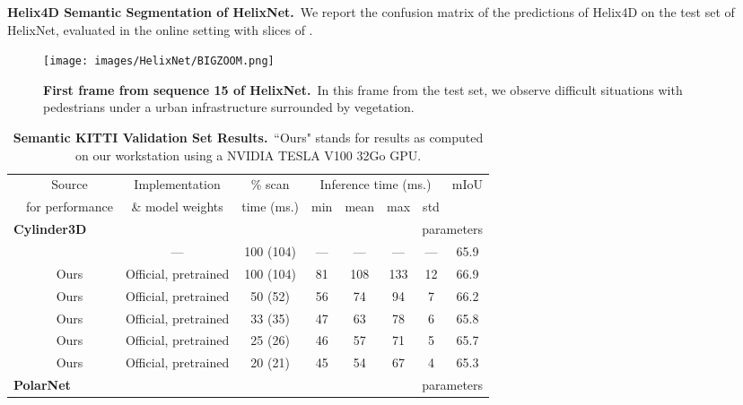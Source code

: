 \documentclass[runningheads]{tpls/llncs}
\begin{document}
\begin{table}[t]
\vspace{.5em}     \caption{\textbf{Helix4D Semantic Segmentation of HelixNet.}~We report the confusion matrix of the predictions of Helix4D on the test set of HelixNet, evaluated in the online setting with slices of .}
    \label{tab:confmat}
\end{table}

\begin{figure}
    \centering
    \texttt{[image: images/HelixNet/BIGZOOM.png]}
    \caption{\textbf{First frame from sequence 15 of HelixNet.}~In this frame from the test set, we observe difficult situations with pedestrians under a urban infrastructure surrounded by vegetation.}
    \label{fig:bigzoom}
\end{figure}

\begin{table*}[t]
    \centering
    \caption{\textbf{Semantic KITTI Validation Set Results.}~``Ours" stands for results as computed on our workstation using a NVIDIA TESLA V100 32Go GPU.}
    \label{tab:detailed}
    \renewcommand{\arraystretch}{1.25}
    \begin{tabular*}{\textwidth}{@{}l@{\extracolsep{\fill}}*{8}{c}@{}}
        \toprule
         & \multirow{1}{*}{Source} & Implementation & {\% scan} & \multicolumn{4}{c}{Inference time (ms.)} & \multirow{2}{*}{mIoU}\\
         & for performance& \& model weights & {time (ms.)} & min & mean & max & std & \\
        \midrule
        \multicolumn{4}{l}{\textbf{Cylinder3D~\cite{zhu2021cylindrical}}} & & \multicolumn{4}{r}{\scriptsize  parameters} \\
        & \cite{zhu2021cylindrical} & --- & 100 (104) & ---  & --- & --- & ---   & 65.9 \\
        & Ours    & Official, pretrained & 100 (104) & 81 & 108 & 133 & 12 & 66.9  \\
        & Ours    & Official, pretrained & 50 (52)   & 56 & 74  & 94  & 7  & 66.2  \\
        & Ours    & Official, pretrained & 33 (35)   & 47 & 63  & 78  & 6  & 65.8  \\
        & Ours    & Official, pretrained & 25 (26)   & 46 & 57  & 71  & 5  & 65.7  \\
        & Ours    & Official, pretrained & 20 (21)   & 45 & 54  & 67  & 4  & 65.3  \\
        \midrule
        \multicolumn{4}{l}{\textbf{PolarNet~\cite{Zhang_2020_CVPR}}} & & \multicolumn{4}{r}{\scriptsize  parameters} \\

\end{tabular*}
\end{table*}
\end{document}

